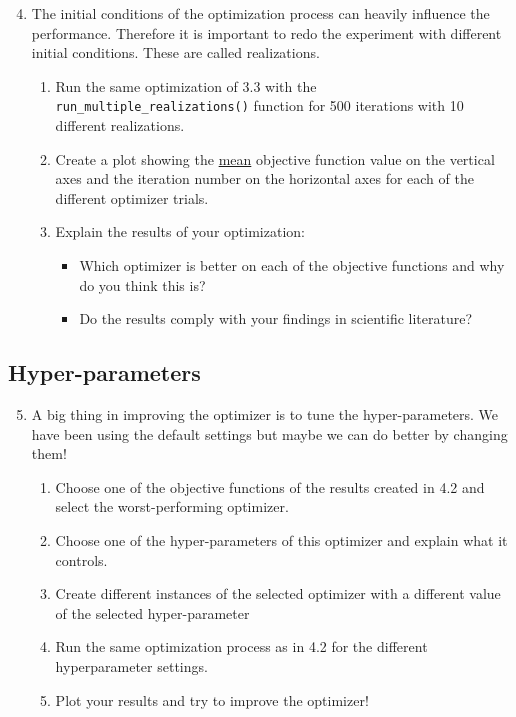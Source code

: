 \documentclass[10pt,a4paper,twoside]{article} %
\def\code#1{\texttt{#1}}
\begin{document}
\begin{enumerate}
	\setcounter{enumi}{3}
	\item The initial conditions of the optimization process can heavily influence the performance. Therefore it is important to redo the experiment with different initial conditions. These are called realizations.
	
	\begin{enumerate} [label*=\arabic*.]
		\item Run the same optimization of 3.3 with the \code{run\_multiple\_realizations()} function for 500 iterations with 10 different realizations.
		
		\item Create a plot showing the \underline{mean} objective function value on the vertical axes and the iteration number on the horizontal axes for each of the different optimizer trials.
		
		\item Explain the results of your optimization:
		\begin{itemize}
			\item Which optimizer is better on each of the objective functions and why do you think this is?
			\item Do the results comply with your findings in scientific literature?
		
		\end{itemize}
	\end{enumerate}
\end{enumerate}

\subsection*{Hyper-parameters}

\begin{enumerate}
	\setcounter{enumi}{4}
	\item A big thing in improving the optimizer is to tune the hyper-parameters. We have been using the default settings but maybe we can do better by changing them!
	
	\begin{enumerate} [label*=\arabic*.]
		\item Choose one of the objective functions of the results created in 4.2 and select the worst-performing optimizer.
		\item Choose one of the hyper-parameters of this optimizer and explain what it controls.
		\item Create different instances of the selected optimizer with a different value of the selected hyper-parameter
		\item Run the same optimization process as in 4.2 for the different hyperparameter settings.
		\item Plot your results and try to improve the optimizer! 
	\end{enumerate}
\end{enumerate}
\end{document}
